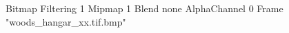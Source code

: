 {Bitmap
	{Filtering 1}
	{Mipmap 1}
	{Blend none}
	{AlphaChannel 0}
	{Frame "woods_hangar_xx.tif.bmp"}
}
